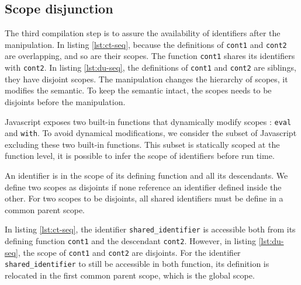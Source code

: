 \subsection{Scope disjunction} \label{section:limits:disjunction}

The third compilation step is to assure the availability of identifiers after the manipulation.
In listing \ref{lst:ct-seq}, because the definitions of \texttt{cont1} and \texttt{cont2} are overlapping, and so are their scopes.
The function \texttt{cont1} shares its identifiers with \texttt{cont2}.
In listing \ref{lst:du-seq}, the definitions of \texttt{cont1} and \texttt{cont2} are siblings, they have disjoint scopes.
The manipulation changes the hierarchy of scopes, it modifies the semantic.
To keep the semantic intact, the scopes needs to be disjoints before the manipulation.

Javascript exposes two built-in functions that dynamically modify scopes : \texttt{eval} and \texttt{with}.
To avoid dynamical modifications, we consider the subset of Javascript excluding these two built-in functions.
This subset is statically scoped at the function level, it is possible to infer the scope of identifiers before run time.

An identifier is in the scope of its defining function and all its descendants.
We define two scopes as disjoints if none reference an identifier defined inside the other.
For two scopes to be disjoints, all shared identifiers must be define in a common parent scope.


In listing \ref{lst:ct-seq}, the identifier \texttt{shared\_identifier} is accessible both from its defining function \texttt{cont1} and the descendant \texttt{cont2}.
However, in listing \ref{lst:du-seq}, the scope of \texttt{cont1} and \texttt{cont2} are disjoints.
For the identifier \texttt{shared\_identifier} to still be accessible in both function, its definition is relocated in the first common parent scope, which is the global scope.

